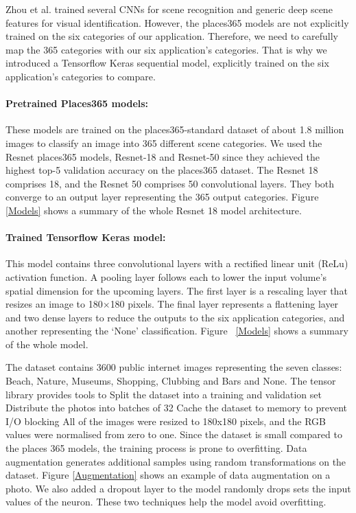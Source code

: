 Zhou et al. \cite{Zhou2018} trained several CNNs for
scene recognition and generic deep scene features for
visual identification. However, the places365 models
are not explicitly trained on the six categories of
our application. Therefore, we need to carefully map
the 365 categories with our six application's
categories. That is why we introduced a Tensorflow
Keras sequential model, explicitly trained on the six
application's categories to compare.

\paragraph{Pretrained Places365 models:} These models
are trained on the places365-standard dataset of about
1.8 million images to classify an image into 365
different scene categories. We used the Resnet
places365 models, Resnet-18 and Resnet-50 since they
achieved the highest top-5 validation accuracy on the
places365 dataset. The Resnet 18 comprises 18, and the
Resnet 50 comprises 50 convolutional layers. They both
converge to an output layer representing the 365
output categories.  Figure \ref{Models} shows a
summary of the whole Resnet 18 model architecture.

\paragraph{Trained Tensorflow Keras model: } This
model contains three convolutional layers with a
rectified linear unit (ReLu) activation function. A
pooling layer follows each to lower the input volume's
spatial dimension for the upcoming layers. The first
layer is a rescaling layer that resizes an image to
180$\times$180 pixels. The final layer represents a
flattening layer and two dense layers to reduce the
outputs to the six application categories, and another
representing the `None' classification. Figure
~\ref{Models} shows a summary of the whole model.

The dataset contains 3600 public internet images
representing the seven classes: Beach, Nature,
Museums, Shopping, Clubbing and Bars and None. The
tensor library provides tools to Split the dataset
into a training and validation set Distribute the
photos into batches of 32 Cache the dataset to memory
to prevent I/O blocking All of the images were resized
to 180x180 pixels, and the RGB values were normalised
from zero to one.  	Since the dataset is small
compared to the places 365 models, the training
process is prone to overfitting. Data augmentation
generates additional samples using random
transformations on the dataset. Figure \ref{Augmentation} shows an
example of data augmentation on a photo. We also added
a dropout layer to the model randomly drops sets the
input values of the neuron. These two techniques help
the model avoid overfitting.



